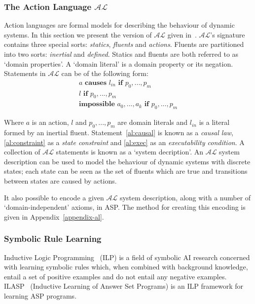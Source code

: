 \documentclass[../interim.tex]{subfiles}
\begin{document}
\subsubsection{The Action Language $\mathcal{AL}$}

Action languages are formal models for describing the behaviour of dynamic systems. In this section we present the version of $\mathcal{AL}$ given in~\cite{krr-asp-book}. $\mathcal{AL}$'s signature contains three special sorts: \textit{statics}, \textit{fluents} and \textit{actions}. Fluents are partitioned into two sorts: \textit{inertial} and \textit{defined}. Statics and fluents are both referred to as `domain properties'. A `domain literal' is a domain property or its negation. Statements in $\mathcal{AL}$ can be of the following form:
\begin{gather}
  a \textbf{ causes } l_{in} \textbf{ if } p_0,...,p_m \label{al:causal} \\
  l \textbf{ if } p_0,...,p_m \label{al:constraint} \\
  \textbf{impossible } a_0,...,a_k \textbf{ if } p_0,...,p_m \label{al:exec}
\end{gather}

Where $a$ is an action, $l$ and $p_0,...,p_m$ are domain literals and $l_{in}$ is a literal formed by an inertial fluent. Statement~\ref{al:causal} is known as a \textit{causal law}, \ref{al:constraint} as a \textit{state constraint} and \ref{al:exec} as an \textit{executability condition}. A collection of $\mathcal{AL}$ statements is known as a `system decription'. An $\mathcal{AL}$ system description can be used to model the behaviour of dynamic systems with discrete states; each state can be seen as the set of fluents which are true and transitions between states are caused by actions.

It also possible to encode a given $\mathcal{AL}$ system description, along with a number of `domain-independent' axioms, in ASP. The method for creating this encoding is given in Appendix~\ref{appendix-al}.

\subsubsection{Symbolic Rule Learning}

Inductive Logic Programming~\cite{ilp-intro} (ILP) is a field of symbolic AI research concerned with learning symbolic rules which, when combined with background knowledge, entail a set of positive examples and do not entail any negative examples. ILASP~\cite{ilasp-system} (Inductive Learning of Answer Set Programs) is an ILP framework for learning ASP programs.
\end{document}
